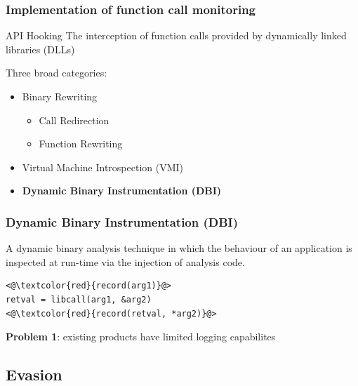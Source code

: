 \documentclass[compress]{beamer}
\begin{document}
\begin{frame}
    \frametitle{Implementation of function call monitoring}
	
	    \begin{beamerboxesrounded}[shadow=true]{API Hooking}
    The interception of function calls provided by dynamically
linked \\ libraries (DLLs)
    \end{beamerboxesrounded}
    \bigskip
	Three broad categories:    
    
    \begin{itemize}
    \item Binary Rewriting
    \begin{itemize}
    \item Call Redirection
    \item Function Rewriting
    \end{itemize}
    \item Virtual Machine Introspection (VMI)
    \item \textbf{Dynamic Binary Instrumentation (DBI)}
    \end{itemize}

\end{frame}

\begin{frame}[fragile]
    \frametitle{Dynamic Binary Instrumentation (DBI)}
	
A dynamic binary analysis
technique in which the behaviour of an application is inspected at run-time via the
injection of analysis code. 
\bigskip
\begin{block}{}
\begin{lstlisting}[basicstyle=\ttfamily\large,xleftmargin=50pt]
<@\textcolor{red}{record(arg1)}@> 
retval = libcall(arg1, &arg2)
<@\textcolor{red}{record(retval, *arg2)}@> 
\end{lstlisting}
\end{block}
\bigskip
\textbf{Problem 1}: existing products have limited logging capabilites

\end{frame}

\subsection{Evasion}
\end{document}
